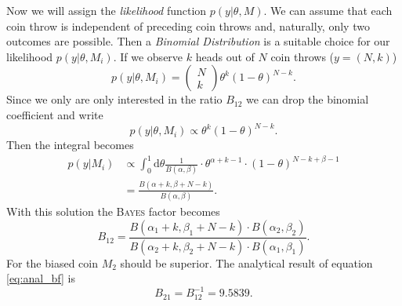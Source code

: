 \documentclass[%
 reprint,
 amsmath,amssymb,
 aps,
]{revtex4-1}
\begin{document}
Now we will assign the \emph{likelihood} function $p(y|\theta,M)$. We can assume that each coin throw is independent of preceding coin throws and, naturally, only two outcomes are possible. Then a \emph{Binomial Distribution} is a suitable choice for our likelihood $p(y|\theta,M_i)$. If we observe $k$ heads out of $N$ coin throws ($y=(N,k)$) $$p(y|\theta,M_i)=\begin{pmatrix}N\\k
\end{pmatrix}\theta^k(1-\theta)^{N-k}.$$
Since we only are only interested in the ratio $B_{12}$ we can drop the binomial coefficient and write $$p(y|\theta, M_i)\propto \theta^k(1-\theta)^{N-k}.$$
Then the integral becomes \cite{PyMC3_BF}
\begin{align*}
	p(y|M_i)&\propto \int_{0}^{1} \text{d}\theta \frac{1}{B(\alpha,\beta)} \cdot \theta^{\alpha+k-1}\cdot (1-\theta)^{N-k+\beta-1}\\
	&=\frac{B(\alpha+k,\beta+N-k)}{B(\alpha, \beta)}.
\end{align*}
With this solution the \textsc{Bayes} factor becomes
\begin{equation}\label{eq:anal_bf}
	B_{12}=\frac{B(\alpha_1+k,\beta_1+N-k)\cdot B(\alpha_2,\beta_2)}{B(\alpha_2+k,\beta_2+N-k)\cdot B(\alpha_1,\beta_1)}.
\end{equation}
For the biased coin $M_2$ should be superior. The analytical result of equation \eqref{eq:anal_bf} is $$B_{21}=B_{12}^{-1}=9.5839.$$
\end{document}
